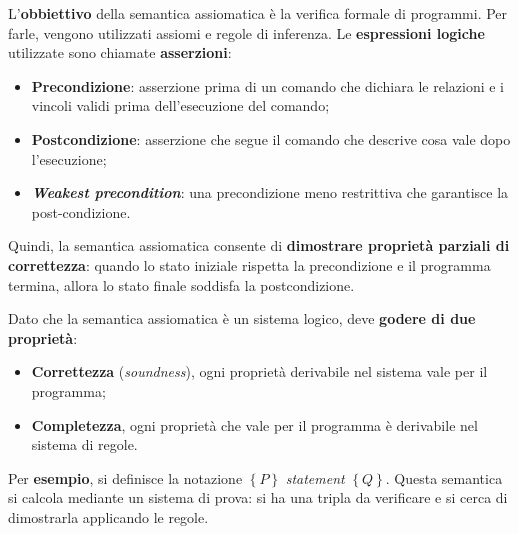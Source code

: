 \documentclass[a4paper]{article}
\begin{document}
	\noindent
	L'\textbf{obbiettivo} della semantica assiomatica è la verifica formale di programmi. Per farle, vengono utilizzati assiomi e regole di inferenza. Le \textbf{espressioni logiche} utilizzate sono chiamate \textbf{asserzioni}:
	\begin{itemize}
		\item \textbf{Precondizione}: asserzione prima di un comando che dichiara le relazioni e i vincoli validi prima dell'esecuzione del comando;
		
		\item \textbf{Postcondizione}: asserzione che segue il comando che descrive cosa vale dopo l'esecuzione;
		
		\item \textbf{\emph{Weakest precondition}}: una precondizione meno restrittiva che garantisce la post-condizione.
	\end{itemize}
	Quindi, la semantica assiomatica consente di \textbf{dimostrare proprietà parziali di correttezza}: quando lo stato iniziale rispetta la precondizione e il programma termina, allora lo stato finale soddisfa la postcondizione.\newline
	
	\noindent
	Dato che la semantica assiomatica è un sistema logico, deve \textbf{godere di due proprietà}:
	\begin{itemize}
		\item \textbf{Correttezza} (\emph{soundness}), ogni proprietà derivabile nel sistema vale per il programma;
		
		\item \textbf{Completezza}, ogni proprietà che vale per il programma è derivabile nel sistema di regole.
	\end{itemize}

	\noindent
	Per \textcolor{Green4}{\textbf{esempio}}, si definisce la notazione $\left\{P\right\}$ \emph{statement} $\left\{Q\right\}$. Questa semantica si calcola mediante un sistema di prova: si ha una tripla da verificare e si cerca di dimostrarla applicando le regole.\newline
	
\end{document}
